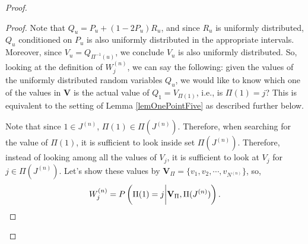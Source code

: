 \begin{proof}
\begin{proof}
Note that ${Q}_u= P_u+(1-2P_u)R_u$, and since $R_u$ is uniformly distributed, ${Q}_u$ conditioned on $P_u$ is also uniformly distributed in the appropriate intervals. Moreover, since ${V}_{u} = {Q}_{\Pi^{-1}(u)}$, we conclude ${V}_{u}$ is also uniformly distributed. So, looking at the definition of $W_j^{(n)}$, we can say the following: given the values of the uniformly distributed random variables ${Q}_u$, we would like to know which one of the values in  $\textbf{V}$ is the actual value of ${Q}_1={V}_{\Pi(1)}$, i.e., is $\Pi(1)=j$? This is equivalent to the setting of Lemma \ref{lemOnePointFive} as described further below. 

Note that since $1 \in J^{(n)}$, $\Pi(1) \in \Pi (J^{(n)})$. Therefore, when searching for the value of $\Pi(1)$, it is sufficient to look inside set $\Pi (J^{(n)})$. Therefore, instead of looking among all the values of ${V}_{j}$, it is sufficient to look at ${V}_{j}$ for $j \in  \Pi (J^{(n)})$. Let's show these values by $\textbf{V}_{\Pi} =\{v_1, v_2, \cdots, v_{N^{(n)}} \}$, so,
\[W_j^{(n)}= P\left(\Pi(1)=j \bigg{|} \textbf{V}_{\Pi}, \Pi (J^{(n)})\right).\]


\end{proof}
\end{proof}
